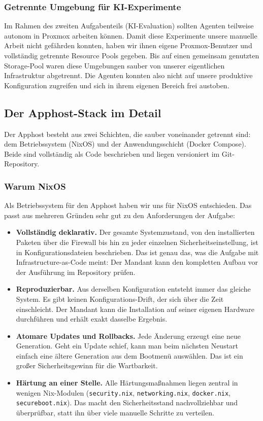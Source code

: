 \subsubsection*{Getrennte Umgebung für \ac{KI}-Experimente}

Im Rahmen des zweiten Aufgabenteils (\ac{KI}-Evaluation) sollten Agenten teilweise
autonom in Proxmox arbeiten können. Damit diese Experimente unsere manuelle
Arbeit nicht gefährden konnten, haben wir ihnen eigene Proxmox-Benutzer und
vollständig getrennte Resource Pools gegeben. Bis auf einen gemeinsam genutzten
Storage-Pool waren diese Umgebungen sauber von unserer eigentlichen
Infrastruktur abgetrennt. Die Agenten konnten also nicht auf unsere produktive
Konfiguration zugreifen und sich in ihrem eigenen Bereich frei austoben.

\subsection{Der Apphost-Stack im Detail}

Der Apphost besteht aus zwei Schichten, die sauber voneinander getrennt sind:
dem Betriebssystem (NixOS) und der Anwendungsschicht (Docker Compose). Beide
sind vollständig als Code beschrieben und liegen versioniert im Git-Repository.

\subsubsection{Warum NixOS}
\label{sec:warum-nixos}

Als Betriebssystem für den Apphost haben wir uns für NixOS entschieden. Das
passt aus mehreren Gründen sehr gut zu den Anforderungen der Aufgabe:

\begin{itemize}
  \item \textbf{Vollständig deklarativ.} Der gesamte Systemzustand, von den
    installierten Paketen über die Firewall bis hin zu jeder einzelnen
    Sicherheitseinstellung, ist in Konfigurationsdateien beschrieben. Das ist
    genau das, was die Aufgabe mit Infrastructure-as-Code meint: Der Mandant kann
    den kompletten Aufbau vor der Ausführung im Repository prüfen.
  \item \textbf{Reproduzierbar.} Aus derselben Konfiguration entsteht immer das
    gleiche System. Es gibt keinen Konfigurations-Drift, der sich über die Zeit
    einschleicht. Der Mandant kann die Installation auf seiner eigenen Hardware
    durchführen und erhält exakt dasselbe Ergebnis.
  \item \textbf{Atomare Updates und Rollbacks.} Jede Änderung erzeugt eine neue
    Generation. Geht ein Update schief, kann man beim nächsten Neustart einfach
    eine ältere Generation aus dem Bootmenü auswählen. Das ist ein großer
    Sicherheitsgewinn für die Wartbarkeit.
  \item \textbf{Härtung an einer Stelle.} Alle Härtungsmaßnahmen liegen
    zentral in wenigen Nix-Modulen (\texttt{security.nix},
    \texttt{networking.nix}, \texttt{docker.nix}, \texttt{secureboot.nix}). Das
    macht den Sicherheitsstand nachvollziehbar und überprüfbar, statt ihn über
    viele manuelle Schritte zu verteilen.
\end{itemize}


